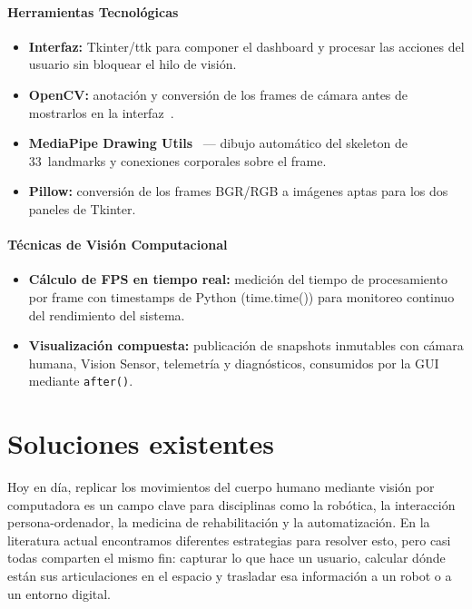 \paragraph{Herramientas Tecnológicas}
\begin{itemize}[leftmargin=1.5em]
  \item \textbf{Interfaz:} Tkinter/ttk para componer el dashboard y procesar
        las acciones del usuario sin bloquear el hilo de visión.
  \item \textbf{OpenCV:} anotación y conversión de los frames de cámara antes
        de mostrarlos en la interfaz~\cite{Bradski2000}.
  \item \textbf{MediaPipe Drawing Utils}~\cite{Lugaresietal2019}
        — dibujo automático del skeleton de 33~landmarks y
        conexiones corporales sobre el frame.
  \item \textbf{Pillow:} conversión de los frames BGR/RGB a imágenes aptas
        para los dos paneles de Tkinter.
\end{itemize}
 
\paragraph{Técnicas de Visión Computacional}
\begin{itemize}[leftmargin=1.5em]
  \item \textbf{Cálculo de FPS en tiempo real:} medición del tiempo
        de procesamiento por frame con timestamps de Python
        (time.time()) para monitoreo continuo del rendimiento
        del sistema.
  \item \textbf{Visualización compuesta:} publicación de snapshots inmutables
        con cámara humana, Vision Sensor, telemetría y diagnósticos, consumidos
        por la GUI mediante \texttt{after()}.
\end{itemize}

\section{Soluciones existentes}

Hoy en día, replicar los movimientos del cuerpo humano mediante visión por computadora es un campo clave para disciplinas como la robótica, la interacción persona-ordenador, la medicina de rehabilitación y la automatización. En la literatura actual encontramos diferentes estrategias para resolver esto, pero casi todas comparten el mismo fin: capturar lo que hace un usuario, calcular dónde están sus articulaciones en el espacio y trasladar esa información a un robot o a un entorno digital.


